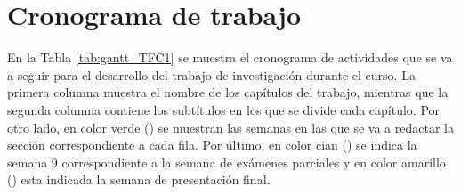 \section{Cronograma de trabajo}

En la Tabla \ref{tab:gantt_TFC1} se muestra el cronograma de actividades que se va a seguir para el desarrollo del trabajo de investigación durante el curso. La primera columna muestra el nombre de los capítulos del trabajo, mientras que la segunda columna contiene los subtítulos en los que se divide cada capítulo. Por otro lado, en color verde () se muestran las semanas en las que se va a redactar la sección correspondiente a cada fila. Por último, en color cian () se indica la semana 9 correspondiente a la semana de exámenes parciales y en color amarillo () esta indicada la semana de presentación final. 

